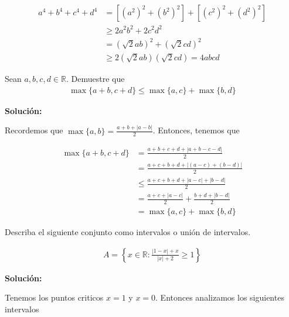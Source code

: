 \documentclass[12pt]{book}
\begin{document}
\begin{align*}
     a^4+b^4+c^4+d^4&=[ (a^2)^2+(b^2)^2]+[(c^2)^2+(d^2)^2] \\
     &\geq2a^2b^2+ 2c^2d^2 \\
     &=(\sqrt{2}ab)^2+(\sqrt{2}cd)^2 \\
     &\geq2(\sqrt{2}ab)(\sqrt{2}cd)=4abcd
\end{align*}

\begin{prob}{}{}
    Sean $a,b,c,d \in \mathbb{R}$. Demuestre que 
    \begin{align*}
        \max\{a+b,c+d\} \leq \max\{a,c\}+\max\{b,d\}
    \end{align*}
\end{prob}

\textbf{Solución:}

Recordemos que $\max\{a,b\}=\frac{a+b+|a-b|}{2}$. Entonces, tenemos que 

\begin{align*}
     \max\{a+b,c+d\} &=\frac{a+b+c+d+|a+b-c-d|}{2} \\
     &=\frac{a+c+b+d+|(a-c)+(b-d)|}{2} \\
     &\leq \frac{a+c+b+d+|a-c|+|b-d|}{2} \\
     &=\frac{a+c+|a-c|}{2}+\frac{b+d+|b-d|}{2}   \\
     &=\max\{a,c\}+\max\{b,d\}
\end{align*}

\begin{prob}{}{}
    Describa el siguiente conjunto como intervalos o unión de intervalos.

    \begin{align*}
        A=\left\{x \in \mathbb{R} : \frac{|1-x|+x}{|x|+2}\geq1\right\}
    \end{align*}
\end{prob}
\textbf{Solución:}

Tenemos los puntos criticos $x=1$ y $x=0$. Entonces analizamos los siguientes intervalos
\end{document}
